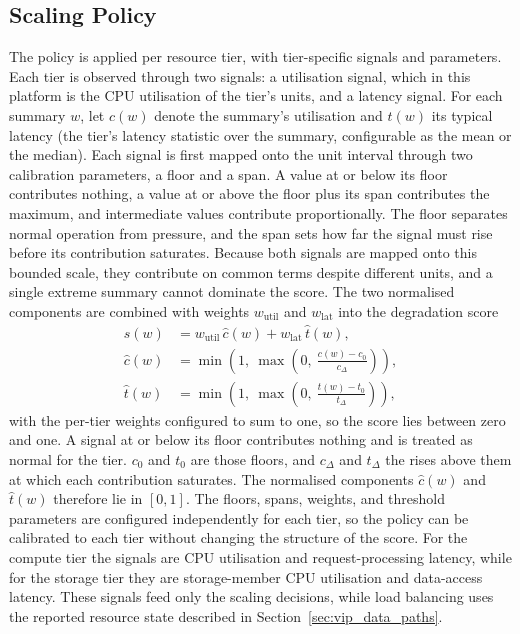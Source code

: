 ﻿\documentclass[12pt,reqno,twoside]{amsbook}
\begin{document}
\subsection{Scaling Policy}\label{sec:scaling_policy}
The policy is applied per resource tier, with tier-specific
signals and parameters. Each tier is observed through two signals: a
utilisation signal, which in this platform is the CPU utilisation of the
tier's units, and a latency signal. For each summary $w$, let
$c(w)$ denote the summary's utilisation and $t(w)$ its typical latency
(the tier's latency statistic over the summary, configurable as the mean or
the median). Each signal is first mapped onto the unit
interval through two calibration parameters, a floor and a span. A value at
or below its floor contributes nothing, a value at or above the floor plus
its span contributes the maximum, and intermediate values contribute
proportionally. The floor separates normal operation from pressure, and the
span sets how far the signal  must rise before its contribution saturates.
Because both signals are mapped onto this bounded scale, they contribute on
common terms despite different units, and a single extreme
summary cannot dominate the score. The two normalised
components are combined with weights $w_{\mathrm{util}}$ and
$w_{\mathrm{lat}}$ into the degradation score
\begin{equation}\label{eq:degradation_score}
\begin{split}
    s(w) &= w_{\mathrm{util}}\,\hat{c}(w) + w_{\mathrm{lat}}\,\hat{t}(w), \\
    \hat{c}(w) &= \min\left(1,\ \max\left(0,\ \frac{c(w)-c_0}{c_\Delta}\right)\right), \\
    \hat{t}(w) &= \min\left(1,\ \max\left(0,\ \frac{t(w)-t_0}{t_\Delta}\right)\right),
\end{split}
\end{equation}
with the per-tier weights configured to sum to one, so the score lies
between zero and one. A signal at or below its floor contributes nothing and
is treated as normal for the tier. $c_0$ and $t_0$ are those floors, and
$c_\Delta$ and $t_\Delta$ the rises above them at which each contribution
saturates. The normalised components $\hat{c}(w)$ and $\hat{t}(w)$ therefore
lie in $[0,1]$.
    The floors, spans, weights, and threshold parameters are configured
independently for each tier, so the policy can be calibrated to each tier
without changing the structure of the score. For the compute tier the signals are CPU
utilisation and request-processing latency, while for the storage tier
they are storage-member CPU utilisation and data-access latency. These
signals feed only the scaling decisions, while load balancing
uses the reported resource state described in
Section~\ref{sec:vip_data_paths}.
\end{document}
